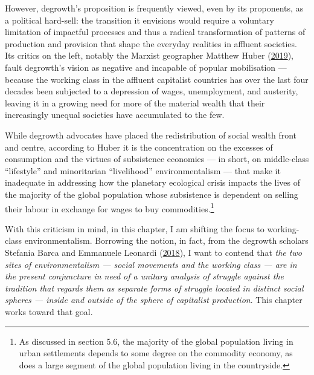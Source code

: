 \documentclass[a4paper, nobind]{templates/ociamthesis}
\begin{document}
However, degrowth's proposition is frequently viewed, even by its proponents, as a political hard-sell: the transition it envisions would require a voluntary limitation of impactful processes and thus a radical transformation of patterns of production and provision that shape the everyday realities in affluent societies. Its critics on the left, notably the Marxist geographer Matthew Huber (\protect\hyperlink{ref-huber_ecological_2019}{2019}), fault degrowth's vision as negative and incapable of popular mobilisation --- because the working class in the affluent capitalist countries has over the last four decades been subjected to a depression of wages, unemployment, and austerity, leaving it in a growing need for more of the material wealth that their increasingly unequal societies have accumulated to the few.

While degrowth advocates have placed the redistribution of social wealth front and centre, according to Huber it is the concentration on the excesses of consumption and the virtues of subsistence economies --- in short, on middle-class ``lifestyle'' and minoritarian ``livelihood'' environmentalism --- that make it inadequate in addressing how the planetary ecological crisis impacts the lives of the majority of the global population whose subsistence is dependent on selling their labour in exchange for wages to buy commodities.\footnote{As discussed in section 5.6, the majority of the global population living in urban settlements depends to some degree on the commodity economy, as does a large segment of the global population living in the countryside.}

With this criticism in mind, in this chapter, I am shifting the focus to working-class environmentalism. Borrowing the notion, in fact, from the degrowth scholars Stefania Barca and Emmanuele Leonardi (\protect\hyperlink{ref-barca_working-class_2018}{2018}), I want to contend that \emph{the two sites of environmentalism --- social movements and the working class --- are in the present conjuncture in need of a unitary analysis of struggle against the tradition that regards them as separate forms of struggle located in distinct social spheres --- inside and outside of the sphere of capitalist production}. This chapter works toward that goal.
\end{document}
